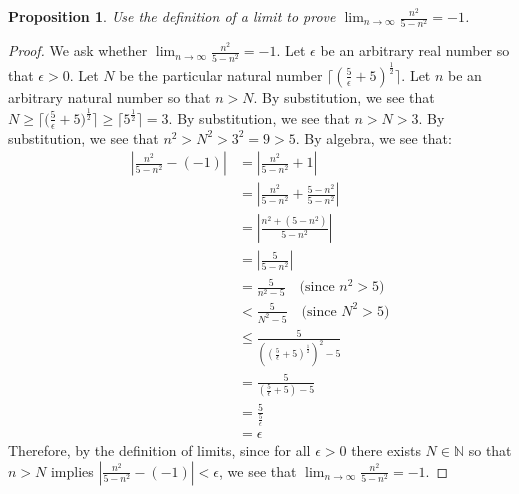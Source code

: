 \documentclass{amsart}
\newtheorem*{proposition}{Proposition}
\newcommand{\limn}{\lim_{n \rightarrow \infty}}
\newcommand{\abs}[1]{\left|#1\right|}
\newcommand{\ceil}[1]{\lceil #1 \rceil}
\newcommand{\N}{\mathbb{N}}
\numberwithin{equation}{section}
\begin{document}
	\begin{problem}[manual-num=69]
		\begin{proposition}
			Use the definition of a limit to prove $\limn \frac{n^2}{5 - n^2} = -1$.
		\end{proposition}

		\begin{proof}
			We ask whether $\limn \frac{n^2}{5 - n^2} = -1$.
			Let $\epsilon$ be an arbitrary real number so that $\epsilon > 0$.
			Let $N$ be the particular natural number $\ceil{({\frac{5}{\epsilon} + 5})^{\frac{1}{2}}}$.
			Let $n$ be an arbitrary natural number so that $n > N$.
			By substitution, we see that $N \geq \ceil{({\frac{5}{\epsilon} + 5)^{\frac{1}{2}}}} \geq \ceil{5^\frac{1}{2}} = 3$.
			By substitution, we see that $n > N > 3$.
			By substitution, we see that $n^2 > N^2 > 3^2 = 9 > 5$.
			By algebra, we see that:
			\begin{align*}
				\abs{\frac{n^2}{5 - n^2} - (-1)}
				&= \abs{\frac{n^2}{5 - n^2} + 1} \\
				&= \abs{\frac{n^2}{5 - n^2} + \frac{5 - n^2}{5 - n^2}} \\
				&= \abs{\frac{n^2 + (5 - n^2)}{5 - n^2}} \\
				&= \abs{\frac{5}{5 - n^2}} \\
				&= \frac{5}{n^2 - 5} \quad \text{(since $n^2 > 5$)} \\
				&< \frac{5}{N^2 - 5} \quad \text{(since $N^2 > 5$)} \\
				&\leq \frac{5}{((\frac{5}{\epsilon} + 5)^{\frac{1}{2}})^2 - 5} \\
				&= \frac{5}{(\frac{5}{\epsilon} + 5) - 5} \\
				&= \frac{5}{\frac{5}{\epsilon}} \\
				&= \epsilon
			\end{align*}
			Therefore, by the definition of limits, since for all $\epsilon > 0$ there exists $N \in \N$ so that $n > N$ implies $\abs{\frac{n^2}{5 - n^2} - (-1)} < \epsilon$, we see that $\limn \frac{n^2}{5 - n^2} = -1$.
		\end{proof}
	\end{problem}
\end{document}
